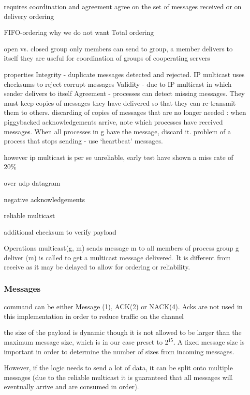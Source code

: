 requires coordination and 
agreement
agree on the set of messages received or on delivery 
ordering

FIFO-ordering
why we do not want Total ordering


open vs. closed group 
 only members can send to group, a member delivers to itself 
 they are useful for coordination of groups of cooperating servers

properties
Integrity - duplicate messages detected and rejected.
IP multicast uses checksums to reject corrupt messages
Validity - due to IP multicast in which sender delivers to 
itself
Agreement - processes can detect missing messages. 
They must keep copies of messages they have 
delivered so that they can re-transmit them to others.
discarding of copies of messages that are no longer 
needed : 
when piggybacked acknowledgements arrive, note which processes 
have received messages. When all processes in g have the message, 
discard it.
problem of a process that stops sending - use ‘heartbeat’ messages.

however ip multicast is per se unreliable, early test have shown a miss rate of 20\%

over udp datagram

negative acknowledgements

reliable multicast

additional checksum to verify payload

Operations 
multicast(g, m) sends message m to all members of process group g
deliver (m) is called to get a multicast message delivered. It is different 
from receive as it may be delayed to allow for ordering or reliability.

\subsubsection{Messages}


command can be either Message (1), ACK(2) or NACK(4). 
Acks are not used in this implementation in order to reduce traffic on the channel 

the size of the payload is dynamic though it is not allowed to be larger than the maximum message size, which is in our case preset to $2^15$. A fixed message size is important in order to determine the number of sizes from incoming messages. 


However, if the logic needs to send a lot of data, it can be split onto multiple messages (due to the reliable multicast it is guaranteed that all messages will eventually arrive and are consumed in order).


